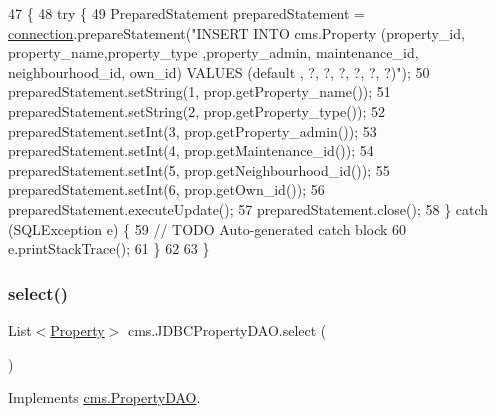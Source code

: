 \begin{DoxyCode}
47                                       \{
48         \textcolor{keywordflow}{try} \{
49             PreparedStatement preparedStatement = \mbox{\hyperlink{classcms_1_1_j_d_b_c_property_d_a_o_abf9c487234968fce867ee559ed4ccd59}{connection}}.prepareStatement(\textcolor{stringliteral}{"INSERT INTO
       cms.Property (property\_id, property\_name,property\_type ,property\_admin, maintenance\_id, neighbourhood\_id, own\_id)
       VALUES (default , ?, ?, ?, ?, ?, ?)"});
50             preparedStatement.setString(1,  prop.getProperty\_name());
51             preparedStatement.setString(2,  prop.getProperty\_type());
52             preparedStatement.setInt(3,  prop.getProperty\_admin());
53             preparedStatement.setInt(4,  prop.getMaintenance\_id());
54             preparedStatement.setInt(5,  prop.getNeighbourhood\_id());
55             preparedStatement.setInt(6,  prop.getOwn\_id());
56             preparedStatement.executeUpdate();
57             preparedStatement.close();
58         \} \textcolor{keywordflow}{catch} (SQLException e) \{
59             \textcolor{comment}{// TODO Auto-generated catch block}
60             e.printStackTrace();
61         \}
62          
63     \}
\end{DoxyCode}
\mbox{\label{classcms_1_1_j_d_b_c_property_d_a_o_a2858ac4d2c7cc8345a02e2ebb555c7f7}} 
\subsubsection{\texorpdfstring{select()}{select()}}
{\footnotesize\ttfamily List$<$\mbox{\hyperlink{classcms_1_1_property}{Property}}$>$ cms.\+J\+D\+B\+C\+Property\+D\+A\+O.\+select (\begin{DoxyParamCaption}{ }\end{DoxyParamCaption})\hspace{0.3cm}{\ttfamily [inline]}}



Implements \mbox{\hyperlink{interfacecms_1_1_property_d_a_o_ad2087f5bf664d57bd7e75c09280b1fe5}{cms.\+Property\+D\+AO}}.


